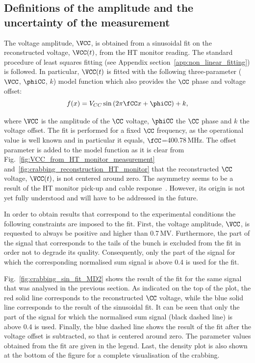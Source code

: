 \subsection{Definitions of the amplitude and the uncertainty of the measurement}\label{subsec:def_amplt_uncertainty}
The voltage amplitude, $\VCC$, is obtained from a sinusoidal fit on the reconstructed voltage, $\VCC (t)$, from the HT monitor reading. The standard procedure of least squares fitting (see Appendix section~\ref{app:non_linear_fitting}) is followed. In particular, $\VCC (t)$ is fitted with the following three-parameter ($\VCC$, $\phiCC$, $k$) model function which also provides the $\CC$ phase and voltage offset:
\begin{equation}\label{eq:sin_fit_cc}
   f(x) = V_{CC}\sin{(2\pi \fCC x + \phiCC)} + k ,
\end{equation}

where $\VCC$ is the amplitude of the $\CC$ voltage, $\phiCC$ the $\CC$ phase and
$k$ the voltage offset. The fit is performed for a fixed $\CC$ frequency, as the operational value is well known and in particular it equals, $\fCC$=400.78\,MHz. The offset parameter is added to the model function as it is clear from Fig.~\ref{fig:VCC_from_HT_monitor_measurement} and~\ref{fig:crabbing_reconstruction_HT_monitor} that the reconstructed $\CC$ voltage, $\VCC(t)$, is not centered around zero. The asymmetry seems to be a result of the HT monitor pick-up and cable response~\cite{Levens_WP2_HT_CC_diagnostic}. However, its origin is not yet fully understood and will have to be addressed in the future. %

In order to obtain results that correspond to the experimental conditions the following constraints are imposed to the fit. First, the voltage amplitude, $\VCC$, is requested to always be positive and higher than 0.7\,MV. Furthermore, the part of the signal that corresponds to the tails of the bunch is excluded from the fit in order not to degrade its quality. Consequently, only the part of the signal for which the corresponding normalised sum signal is above 0.4 is used for the fit. 

Fig.~\ref{fig:crabbing_sin_fit_MD2} shows the result of the fit for the same signal that was analysed in the previous section. As indicated on the top of the plot, the red solid line corresponds to the reconstructed $\CC$ voltage, while the blue solid line corresponds to the result of the sinusoidal fit. It can be seen that only the part of the signal for which the normalised sum signal (black dashed line) is above 0.4 is used. Finally, the blue dashed line shows the result of the fit after the voltage offset is subtracted, so that is centered around zero. The parameter values obtained from the fit are given in the legend. Last, the density plot is also shown at the bottom of the figure for a complete visualisation of the crabbing. 

